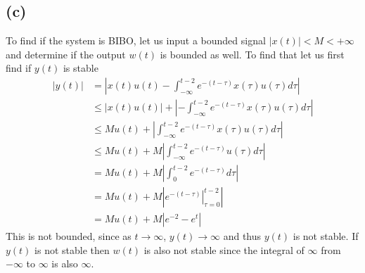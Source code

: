 \documentclass[12pt]{article}
\begin{document}
\subsection*{(c)}
To find if the system is BIBO, let us input a bounded signal $|x(t)|<M<+\infty$ and determine if the output $w(t)$ is bounded as well. To find that let us first find if $y(t)$ is stable
\begin{align*}
|y(t)|&=\left|x(t)u(t)-\int_{-\infty}^{t-2}e^{-(t-\tau)}x(\tau)u(\tau)d\tau\right|\\
&\leq\left|x(t)u(t)\right|+\left|-\int_{-\infty}^{t-2}e^{-(t-\tau)}x(\tau)u(\tau)d\tau\right|\\
&\leq Mu(t)+\left|\int_{-\infty}^{t-2}e^{-(t-\tau)}x(\tau)u(\tau)d\tau\right|\\
&\leq Mu(t)+M\left|\int_{-\infty}^{t-2}e^{-(t-\tau)}u(\tau)d\tau\right|\\
&=Mu(t)+M\left|\int_{0}^{t-2}e^{-(t-\tau)}d\tau\right|\\
&=Mu(t)+M\left|\left.e^{-(t-\tau)}\right|_{\tau=0}^{t-2}\right|\\
&=Mu(t)+M\left|e^{-2}-e^{t}\right|
\end{align*}
This is not bounded, since as $t\to\infty$, $y(t)\to\infty$ and thus $y(t)$ is not stable. If $y(t)$ is not stable then $w(t)$ is also not stable since the integral of $\infty$ from $-\infty$ to $\infty$ is also $\infty$.
\end{document}
